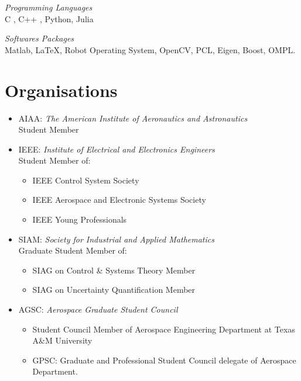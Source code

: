 \documentclass[margin,line]{resume}
\begin{document}
\begin{resume}
	\emph{Programming Languages}\\ C , C++ , Python, Julia

	\vspace{-2mm}

    \vspace{-2mm}
	\emph{Softwares Packages}\\
	Matlab, \LaTeX, Robot Operating System, OpenCV, PCL, Eigen, Boost, OMPL.

    \section{\mysidestyle Organisations}
    \begin{itemize}
        \item AIAA: \emph{The American Institute of Aeronautics and Astronautics}\\
        Student Member
        \item IEEE: \emph{Institute of Electrical and Electronics Engineers}\\
        Student Member of:
        \begin{itemize}
            \item IEEE Control System Society
            \item IEEE Aerospace and Electronic Systems Society
            \item IEEE Young Professionals
        \end{itemize}
        \item SIAM: \emph{Society for Industrial and Applied Mathematics}\\
        Graduate Student Member of:
            \begin{itemize}
                \item  SIAG on Control \& Systems Theory Member
                \item SIAG on Uncertainty Quantification Member
            \end{itemize}
        \item AGSC: \emph{Aerospace Graduate Student Council}
        \begin{itemize}
            \item Student Council Member of Aerospace Engineering Department at Texas A\&M University
            \item GPSC: Graduate and Professional Student Council delegate of Aerospace Department.
        \end{itemize}
    \end{itemize}

\end{resume}
\end{document}
